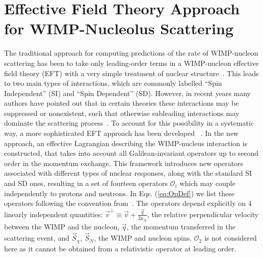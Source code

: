\section{Effective Field Theory Approach for WIMP-Nucleolus Scattering}
\label{sec:intro_EFT}

The traditional approach for computing predictions of the rate of WIMP-nucleon scattering has been to take only leading-order terms in a WIMP-nucleon effective field theory (EFT) with a very simple treatment of nuclear structure~\cite{LEWIN}. This leads to two main types of interactions, which are commonly labelled ``Spin Independent'' (SI) and ``Spin Dependent'' (SD). However, in recent years many authors have pointed out that in certain theories these interactions may be suppressed or nonexistent, such that otherwise subleading interactions may dominate the scattering process~\cite{Chang:2009yt}. To account for this possibility in a systematic way, a more sophisticated EFT approach has been developed ~\cite{Fitzpatrick:2012ib,Anand:MathTools,Fitzpatrick:MathTools}. In the new approach, an effective Lagrangian describing the WIMP-nucleus interaction is constructed, that takes into account all Galilean-invariant operators up to second order in the momentum exchange. This framework introduces new operators associated with different types of nuclear responses, along with the standard SI and SD ones, resulting in a set of fourteen operators $\mathcal{O}_i$ which may couple independently to protons and neutrons. In Eqs. (\ref{eq:OpDef}) we list these operators following the convention from~\cite{Anand:MathTools}. The operators depend explicitly on 4 linearly independent quantities: $\vec{v}^{\perp} \equiv \vec{v} + \frac{\vec{q}}{2\mu_N} $, the relative perpendicular velocity between the WIMP and the nucleon, $\vec{q}$, the momentum transferred in the scattering event, and $\vec{S}_\chi$, $\vec{S}_N$, the WIMP and nucleon spins. $\mathcal{O}_2$ is not considered here as it cannot be obtained from a relativistic operator at leading order.
%

